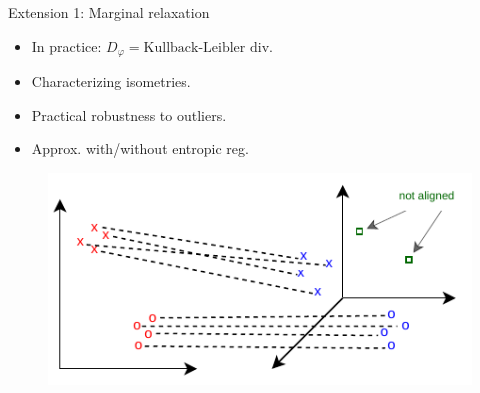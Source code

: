 \documentclass{beamer}
\begin{document}
\begin{frame}{Extension 1: Marginal relaxation}
  \begin{minipage}[t]{0.6\linewidth}
  \begin{itemize}
    \item In practice: $D_{\varphi} = \text{Kullback-Leibler div}$.
    \item Characterizing isometries.
    \item Practical robustness to outliers.
    \item Approx. with/without entropic reg.
  \end{itemize}
  \end{minipage}%
  \hfill%
  \hspace{-6cm}
  \begin{minipage}[t]{0.5\linewidth}
    \vspace{-0.cm}
  \begin{figure}
    \centering
    \includegraphics[width=1.1\linewidth, keepaspectratio=true]{OT_new/ugw.pdf}
  \end{figure}
  \end{minipage}

\end{frame}
\end{document}
